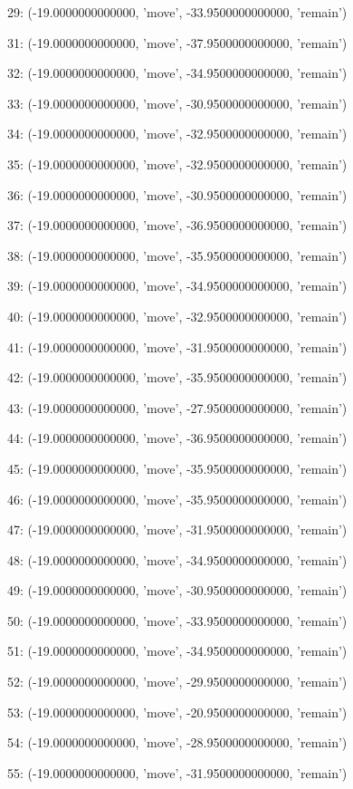 29: (-19.0000000000000, 'move', -33.9500000000000, 'remain')


31: (-19.0000000000000, 'move', -37.9500000000000, 'remain')


32: (-19.0000000000000, 'move', -34.9500000000000, 'remain')


33: (-19.0000000000000, 'move', -30.9500000000000, 'remain')


34: (-19.0000000000000, 'move', -32.9500000000000, 'remain')


35: (-19.0000000000000, 'move', -32.9500000000000, 'remain')


36: (-19.0000000000000, 'move', -30.9500000000000, 'remain')


37: (-19.0000000000000, 'move', -36.9500000000000, 'remain')


38: (-19.0000000000000, 'move', -35.9500000000000, 'remain')


39: (-19.0000000000000, 'move', -34.9500000000000, 'remain')


40: (-19.0000000000000, 'move', -32.9500000000000, 'remain')


41: (-19.0000000000000, 'move', -31.9500000000000, 'remain')


42: (-19.0000000000000, 'move', -35.9500000000000, 'remain')


43: (-19.0000000000000, 'move', -27.9500000000000, 'remain')


44: (-19.0000000000000, 'move', -36.9500000000000, 'remain')


45: (-19.0000000000000, 'move', -35.9500000000000, 'remain')


46: (-19.0000000000000, 'move', -35.9500000000000, 'remain')


47: (-19.0000000000000, 'move', -31.9500000000000, 'remain')


48: (-19.0000000000000, 'move', -34.9500000000000, 'remain')


49: (-19.0000000000000, 'move', -30.9500000000000, 'remain')


50: (-19.0000000000000, 'move', -33.9500000000000, 'remain')


51: (-19.0000000000000, 'move', -34.9500000000000, 'remain')


52: (-19.0000000000000, 'move', -29.9500000000000, 'remain')


53: (-19.0000000000000, 'move', -20.9500000000000, 'remain')


54: (-19.0000000000000, 'move', -28.9500000000000, 'remain')


55: (-19.0000000000000, 'move', -31.9500000000000, 'remain')


